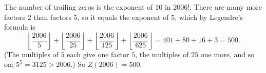 The number of trailing zeros is the exponent of $10$ in $2006!$. There are many more factors $2$ than factors $5$, so it equals the exponent of $5$, which by Legendre's formula is
\[
\left\lfloor\dfrac{2006}{5}\right\rfloor+\left\lfloor\dfrac{2006}{25}\right\rfloor+\left\lfloor\dfrac{2006}{125}\right\rfloor+\left\lfloor\dfrac{2006}{625}\right\rfloor=401+80+16+3=500 .
\]
(The multiples of $5$ each give one factor $5$, the multiples of $25$ one more, and so on; $5^5=3125>2006$.) So $Z(2006)=\boxed{500}$.
